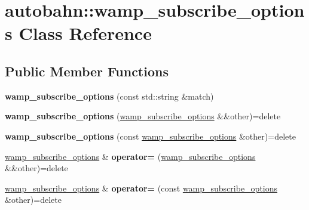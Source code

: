 \hypertarget{classautobahn_1_1wamp__subscribe__options}{}\section{autobahn\+:\+:wamp\+\_\+subscribe\+\_\+options Class Reference}
\label{classautobahn_1_1wamp__subscribe__options}
\subsection*{Public Member Functions}
\begin{DoxyCompactItemize}
\item 
{\bfseries wamp\+\_\+subscribe\+\_\+options} (const std\+::string \&match)\hypertarget{classautobahn_1_1wamp__subscribe__options_a324546b09f30ce60c5bfdc2524ca1ac8}{}\label{classautobahn_1_1wamp__subscribe__options_a324546b09f30ce60c5bfdc2524ca1ac8}

\item 
{\bfseries wamp\+\_\+subscribe\+\_\+options} (\hyperlink{classautobahn_1_1wamp__subscribe__options}{wamp\+\_\+subscribe\+\_\+options} \&\&other)=delete\hypertarget{classautobahn_1_1wamp__subscribe__options_a6c645bc68e51bed7989bf6e0e5563cd9}{}\label{classautobahn_1_1wamp__subscribe__options_a6c645bc68e51bed7989bf6e0e5563cd9}

\item 
{\bfseries wamp\+\_\+subscribe\+\_\+options} (const \hyperlink{classautobahn_1_1wamp__subscribe__options}{wamp\+\_\+subscribe\+\_\+options} \&other)=delete\hypertarget{classautobahn_1_1wamp__subscribe__options_affed2224622ebef12a9a2f1f7c3a498f}{}\label{classautobahn_1_1wamp__subscribe__options_affed2224622ebef12a9a2f1f7c3a498f}

\item 
\hyperlink{classautobahn_1_1wamp__subscribe__options}{wamp\+\_\+subscribe\+\_\+options} \& {\bfseries operator=} (\hyperlink{classautobahn_1_1wamp__subscribe__options}{wamp\+\_\+subscribe\+\_\+options} \&\&other)=delete\hypertarget{classautobahn_1_1wamp__subscribe__options_aaa417a499a8a374142aebc1d3bbd0801}{}\label{classautobahn_1_1wamp__subscribe__options_aaa417a499a8a374142aebc1d3bbd0801}

\item 
\hyperlink{classautobahn_1_1wamp__subscribe__options}{wamp\+\_\+subscribe\+\_\+options} \& {\bfseries operator=} (const \hyperlink{classautobahn_1_1wamp__subscribe__options}{wamp\+\_\+subscribe\+\_\+options} \&other)=delete\hypertarget{classautobahn_1_1wamp__subscribe__options_a7a5b999116f6544ef5f0037d39d1a703}{}\label{classautobahn_1_1wamp__subscribe__options_a7a5b999116f6544ef5f0037d39d1a703}


\end{DoxyCompactItemize}
